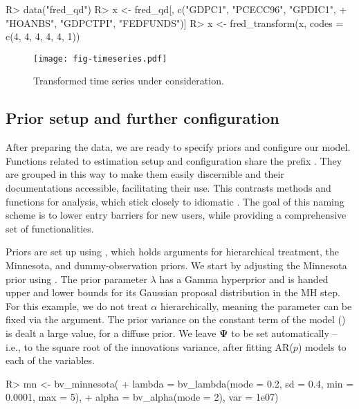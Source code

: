 \documentclass[article,nojss]{jss} %
\begin{document}
\begin{Schunk}
\begin{Sinput}
R> data("fred_qd")
R> x <- fred_qd[, c("GDPC1", "PCECC96", "GPDIC1",
+    "HOANBS", "GDPCTPI", "FEDFUNDS")]
R> x <- fred_transform(x, codes = c(4, 4, 4, 4, 4, 1))
\end{Sinput}
\end{Schunk}


\begin{figure}[ht]
	\centering
  \texttt{[image: fig-timeseries.pdf]}
	\caption{Transformed time series under consideration.}
	\label{fig:timeseries}
\end{figure}

\subsection{Prior setup and further configuration} \label{subsec:setup}

After preparing the data, we are ready to specify priors and configure our model.
Functions related to estimation setup and configuration share the prefix . They are grouped in this way to make them easily discernible and their documentations accessible, facilitating their use.
This contrasts methods and functions for analysis, which stick closely to idiomatic .
The goal of this naming scheme is to lower entry barriers for new users, while providing a comprehensive set of functionalities.

Priors are set up using , which holds arguments for hierarchical treatment, the Minnesota, and dummy-observation priors.
We start by adjusting the Minnesota prior using . The prior parameter $\lambda$ has a Gamma hyperprior and is handed upper and lower bounds for its Gaussian proposal distribution in the MH step. For this example, we do not treat $\alpha$ hierarchically, meaning the parameter can be fixed via the  argument. The prior variance on the constant term of the model () is dealt a large value, for a diffuse prior. We leave $\boldsymbol{\Psi}$ to be set automatically -- i.e., to the square root of the innovations variance, after fitting AR($p$) models to each of the variables.

\begin{Schunk}
\begin{Sinput}
R> mn <- bv_minnesota(
+    lambda = bv_lambda(mode = 0.2, sd = 0.4, min = 0.0001, max = 5),
+    alpha = bv_alpha(mode = 2), var = 1e07)
\end{Sinput}
\end{Schunk}
\end{document}
